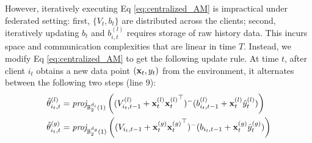 However, iteratively executing Eq \eqref{eq:centralized_AM} is impractical under federated setting: first, $\{{V}_{t},{b}_{t}\}$ are distributed across the clients; second, iteratively updating $b_{t}$ and $b^{(l)}_{i,t}$ requires storage of raw history data. 
This incurs space and communication complexities that are linear in time $T$.
Instead, we modify Eq \eqref{eq:centralized_AM} to get the following update rule. At time $t$, after client $i_{t}$ obtains a new data point $(\mathbf{x}_{t},y_{t})$ from the environment, it alternates between the following two steps (line 9):
\begin{equation}\label{eq:AM}
\begin{split}
    \hat{\theta}^{(l)}_{i_{t},t} &= \textit{proj}_{\mathbb{B}_{2}^{d_{i}}(1)}\left(({V}^{(l)}_{i_{t},t-1}+\mathbf{x}_{t}^{(l)}{\mathbf{x}_{t}^{(l)}}^{\top})^{-}({b}^{(l)}_{i_{t},t-1}+\mathbf{x}_{t}^{(l)}\hat{y}^{(l)}_{t})\right)\\
    \hat{\theta}^{(g)}_{i_{t},t} &= \textit{proj}_{\mathbb{B}_{2}^{d_{g}}(1)}\left((V_{i_{t},t-1}+\mathbf{x}_{t}^{(g)}{\mathbf{x}_{t}^{(g)}}^{\top})^{-}({b}_{i_{t},t-1}+\mathbf{x}_{t}^{(g)}\hat{y}^{(g)}_{t})\right)
\end{split}
\end{equation}
